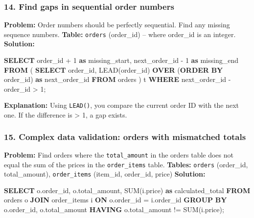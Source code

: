 \documentclass[
  11pt,
  openany,
  oneside]{book}
\newenvironment{Shaded}{}{}
\newcommand{\DecValTok}[1]{\textcolor[rgb]{0.25,0.63,0.44}{#1}}
\newcommand{\FunctionTok}[1]{\textcolor[rgb]{0.02,0.16,0.49}{#1}}
\newcommand{\KeywordTok}[1]{\textcolor[rgb]{0.00,0.44,0.13}{\textbf{#1}}}
\newcommand{\NormalTok}[1]{#1}
\newcommand{\OperatorTok}[1]{\textcolor[rgb]{0.40,0.40,0.40}{#1}}
\begin{document}
\subsubsection{14. Find gaps in sequential order
numbers}\label{find-gaps-in-sequential-order-numbers}

\textbf{Problem:} Order numbers should be perfectly sequential. Find any
missing sequence numbers. \textbf{Table:} \texttt{orders} (order\_id) --
where order\_id is an integer. \textbf{Solution:}

\begin{Shaded}
\begin{Highlighting}[]
\KeywordTok{SELECT} 
\NormalTok{    order\_id }\OperatorTok{+} \DecValTok{1} \KeywordTok{as}\NormalTok{ missing\_start, }
\NormalTok{    next\_order\_id }\OperatorTok{{-}} \DecValTok{1} \KeywordTok{as}\NormalTok{ missing\_end}
\KeywordTok{FROM}\NormalTok{ (}
    \KeywordTok{SELECT} 
\NormalTok{        order\_id, }
        \FunctionTok{LEAD}\NormalTok{(order\_id) }\KeywordTok{OVER}\NormalTok{ (}\KeywordTok{ORDER} \KeywordTok{BY}\NormalTok{ order\_id) }\KeywordTok{as}\NormalTok{ next\_order\_id}
    \KeywordTok{FROM}\NormalTok{ orders}
\NormalTok{) t}
\KeywordTok{WHERE}\NormalTok{ next\_order\_id }\OperatorTok{{-}}\NormalTok{ order\_id }\OperatorTok{\textgreater{}} \DecValTok{1}\NormalTok{;}
\end{Highlighting}
\end{Shaded}

\textbf{Explanation:} Using \texttt{LEAD()}, you compare the current
order ID with the next one. If the difference is \textgreater{} 1, a gap
exists.

\subsubsection{15. Complex data validation: orders with mismatched
totals}\label{complex-data-validation-orders-with-mismatched-totals}

\textbf{Problem:} Find orders where the \texttt{total\_amount} in the
orders table does not equal the sum of the prices in the
\texttt{order\_items} table. \textbf{Tables:} \texttt{orders}
(order\_id, total\_amount), \texttt{order\_items} (item\_id, order\_id,
price) \textbf{Solution:}

\begin{Shaded}
\begin{Highlighting}[]
\KeywordTok{SELECT} 
\NormalTok{    o.order\_id, }
\NormalTok{    o.total\_amount, }
    \FunctionTok{SUM}\NormalTok{(i.price) }\KeywordTok{as}\NormalTok{ calculated\_total}
\KeywordTok{FROM}\NormalTok{ orders o}
\KeywordTok{JOIN}\NormalTok{ order\_items i }\KeywordTok{ON}\NormalTok{ o.order\_id }\OperatorTok{=}\NormalTok{ i.order\_id}
\KeywordTok{GROUP} \KeywordTok{BY}\NormalTok{ o.order\_id, o.total\_amount}
\KeywordTok{HAVING}\NormalTok{ o.total\_amount }\OperatorTok{!=} \FunctionTok{SUM}\NormalTok{(i.price);}
\end{Highlighting}
\end{Shaded}
\end{document}
